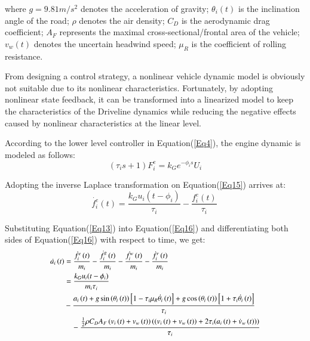 \documentclass[journal]{IEEEtran}
\begin{document}
where $g=9.81m/s^2$ denotes the acceleration of gravity; $\theta_i(t)$ is the inclination angle of the road; $\rho$ denotes the air density; $C_D$ is the aerodynamic drag coefficient; $A_F$ represents the maximal cross-sectional/frontal area of the vehicle; $v_w(t)$ denotes the uncertain headwind speed; $\mu_R$ is the coefficient of rolling resistance.

From designing a control strategy, a nonlinear vehicle dynamic model is obviously not suitable due to its nonlinear characteristics. Fortunately, by adopting nonlinear state feedback, it can be transformed into a linearized model to keep the characteristics of the Driveline dynamics while reducing the negative effects caused by nonlinear characteristics at the linear level.

According to the lower level controller in Equation(\ref{Eq4}), the engine dynamic is modeled as follows:
\begin{equation}
  \left(\tau_is+1\right)F_i^e=k_Ge^{-\phi_is}U_i
  \label{Eq15}
\end{equation}


Adopting the inverse Laplace transformation on Equation(\ref{Eq15}) arrives at:
\begin{equation}
  \dot{f_i^e}\left(t\right)=\frac{k_Gu_i(t-\phi_i)}{\tau_i}-\frac{f_i^e\left(t\right)}{\tau_i}\
  \label{Eq16}
\end{equation}

Substituting Equation(\ref{Eq13}) into Equation(\ref{Eq16}) and differentiating both sides of Equation(\ref{Eq16}) with respect to time, we get:
\begin{equation}
  \begin{small}
    \begin{aligned}
      \dot{a_i}\left(t\right) & =\frac{\dot{f_i^e}\left(t\right)}{m_i}-\frac{\dot{f_i^g}\left(t\right)}{m_i}-\frac{\dot{f_i^w}\left(t\right)}{m_i}-\frac{\dot{f_i^r}\left(t\right)}{m_i}                                                       \\
                              & =\frac{k_Gu_i(t-\phi_i)}{{m_i\tau}_i}                                                                                                                                                                          \\&-\frac{a_i\left(t\right)+g\sin{\left(\theta_i\left(t\right)\right)}\left[1-\tau_i\mu_R\dot{\theta_i}\left(t\right)\right]+g\cos{\left(\theta_i\left(t\right)\right)}\left[1+\tau_i\dot{\theta_i}\left(t\right)\right]}{\tau_i} \\
                              & \quad -\frac{\frac{1}{2}\rho C_DA_F\left(v_i\left(t\right)+v_w\left(t\right)\right)\left(\left(v_i\left(t\right)+v_w\left(t\right)\right)+2\tau_i(a_i\left(t\right)+\dot{v}_{w}\left(t\right))\right)}{\tau_i}
    \end{aligned}
    \label{Eq17}
  \end{small}
\end{equation}
\end{document}
